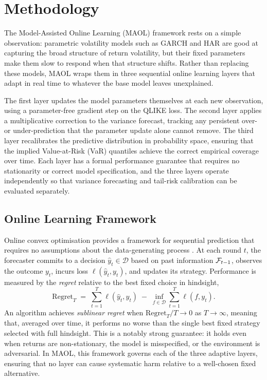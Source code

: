 \section{Methodology}\label{sec:methodology}

The Model-Assisted Online Learning (MAOL) framework rests on a simple observation: parametric volatility models such as GARCH and HAR are good at capturing the broad structure of return volatility, but their fixed parameters make them slow to respond when that structure shifts. Rather than replacing these models, MAOL wraps them in three sequential online learning layers that adapt in real time to whatever the base model leaves unexplained.

The first layer updates the model parameters themselves at each new observation, using a parameter-free gradient step on the QLIKE loss. The second layer applies a multiplicative correction to the variance forecast, tracking any persistent over- or under-prediction that the parameter update alone cannot remove. The third layer recalibrates the predictive distribution in probability space, ensuring that the implied Value-at-Risk (VaR) quantiles achieve the correct empirical coverage over time. Each layer has a formal performance guarantee that requires no stationarity or correct model specification, and the three layers operate independently so that variance forecasting and tail-risk calibration can be evaluated separately.

\subsection{Online Learning Framework}\label{sec:olt}

Online convex optimisation provides a framework for sequential prediction that requires no assumptions about the data-generating process \citep{hazan2016introduction,cesa2006prediction}. At each round $t$, the forecaster commits to a decision $\hat{y}_t \in \mathcal{D}$ based on past information $\mathcal{F}_{t-1}$, observes the outcome $y_t$, incurs loss $\ell(\hat{y}_t, y_t)$, and updates its strategy. Performance is measured by the \emph{regret} relative to the best fixed choice in hindsight,
\begin{equation}\label{eq:regret_def}
    \mathrm{Regret}_T \;=\; \sum_{t=1}^T \ell(\hat{y}_t, y_t) \;-\; \inf_{f \in \mathcal{D}} \sum_{t=1}^T \ell(f, y_t).
\end{equation}
An algorithm achieves \emph{sublinear regret} when $\mathrm{Regret}_T / T \to 0$ as $T \to \infty$, meaning that, averaged over time, it performs no worse than the single best fixed strategy selected with full hindsight. This is a notably strong guarantee: it holds even when returns are non-stationary, the model is misspecified, or the environment is adversarial. In MAOL, this framework governs each of the three adaptive layers, ensuring that no layer can cause systematic harm relative to a well-chosen fixed alternative.

